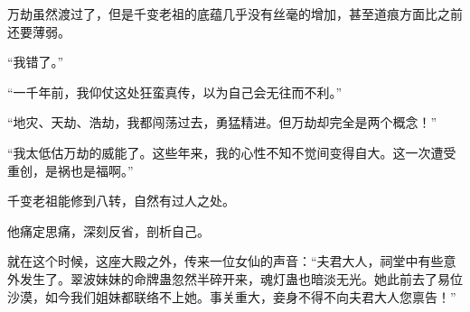 \begin{this_body}
万劫虽然渡过了，但是千变老祖的底蕴几乎没有丝毫的增加，甚至道痕方面比之前还要薄弱。

“我错了。”

“一千年前，我仰仗这处狂蛮真传，以为自己会无往而不利。”

“地灾、天劫、浩劫，我都闯荡过去，勇猛精进。但万劫却完全是两个概念！”

“我太低估万劫的威能了。这些年来，我的心性不知不觉间变得自大。这一次遭受重创，是祸也是福啊。”

千变老祖能修到八转，自然有过人之处。

他痛定思痛，深刻反省，剖析自己。

就在这个时候，这座大殿之外，传来一位女仙的声音：“夫君大人，祠堂中有些意外发生了。翠波妹妹的命牌蛊忽然半碎开来，魂灯蛊也暗淡无光。她此前去了易位沙漠，如今我们姐妹都联络不上她。事关重大，妾身不得不向夫君大人您禀告！”

\end{this_body}

